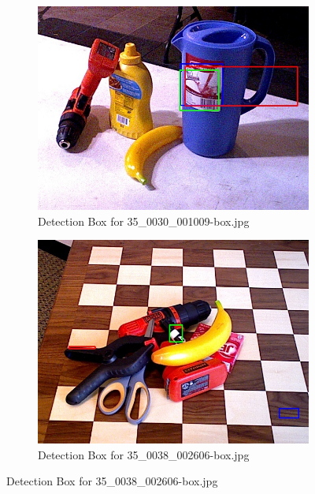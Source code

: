 \documentclass[10.5pt,a4paper]{article}
\begin{document}
\begin{figure}
    \vspace{2em}

    \begin{subfigure}{0.45\textwidth}
        \centering
        \includegraphics[width=\textwidth]{img/35_0030_001009-box.jpg}
        \caption{Detection Box for 35\_0030\_001009-box.jpg}
        \label{fig:img27}
    \end{subfigure}
    \hfill
    \begin{subfigure}{0.45\textwidth}
        \centering
        \includegraphics[width=\textwidth]{img/35_0038_002606-box.jpg}
        \caption{Detection Box for 35\_0038\_002606-box.jpg}
        \label{fig:img28}
    \end{subfigure}
    

\end{figure}
\end{document}
